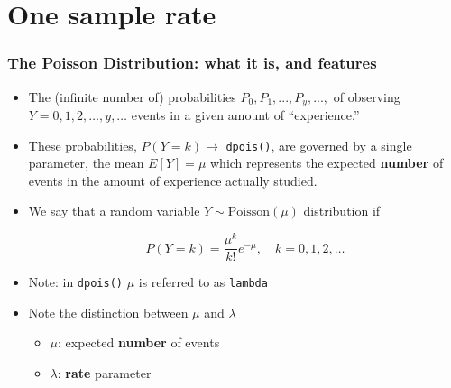 \documentclass[handout]{beamer}\usepackage[]{graphicx}\usepackage[]{color}
\begin{document}
\section{One sample rate}

\begin{frame}
\frametitle{The Poisson Distribution: what it is, and features}

\begin{itemize}
	\small
	\setlength\itemsep{1em}
	\item The (infinite number of) probabilities $P_{0}, P_{1}, ..., P_{y}, ..., $ of observing 
	$Y = 0, 1, 2, \dots , y, \dots $ events in a given amount of ``experience.''
	
	\item These probabilities, $P(Y = k) \to$ \texttt{dpois()}, are governed by a single parameter, the mean $E[Y] = \mu$ which represents the expected \textbf{number} of events in the amount of experience actually studied.
	
	\item We say that a random variable $Y \sim \textrm{Poisson}(\mu)$ distribution if 
	
	\[ P(Y=k) = \frac{\mu^k}{k!}e^{-\mu}, \quad k = 0, 1, 2, \ldots\]
	\pause 
	
	\item Note: in \texttt{dpois()} $\mu$ is referred to as \texttt{lambda}
	
	\item Note the distinction between $\mu$ and $\lambda$
	\begin{itemize}
		\item $\mu$: expected \textbf{number} of events
		\item $\lambda$: \textbf{rate} parameter
	\end{itemize}
\end{itemize}
\end{frame}
\end{document}
